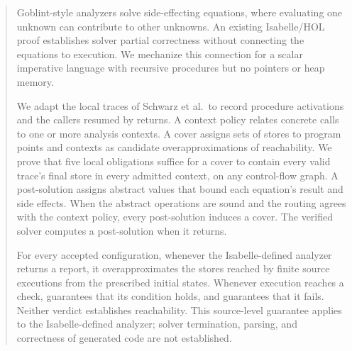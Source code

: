 \begin{abstract}
Goblint-style analyzers solve side-effecting equations, where evaluating one
unknown can contribute to other unknowns. An existing Isabelle/HOL proof
establishes solver partial correctness without connecting the equations to
execution. We mechanize this connection for a scalar imperative language
with recursive procedures but no pointers or heap memory.

We adapt the local traces of Schwarz et al.\ to record procedure activations
and the callers resumed by returns. A context policy relates concrete calls
to one or more analysis contexts. A cover assigns sets of stores to program
points and contexts as candidate overapproximations of reachability.
We prove that five local obligations suffice for a cover to contain every
valid trace's final store in every admitted context, on any control-flow
graph. A post-solution assigns abstract values that bound each equation's
result and side effects. When the abstract operations are sound and the
routing agrees with the context policy, every post-solution induces a
cover. The verified solver computes a post-solution when it returns.

For every accepted configuration, whenever the Isabelle-defined analyzer
returns a report, it overapproximates the stores reached by finite
source executions from the prescribed initial states. Whenever execution
reaches a check,  guarantees that its condition holds,
and  guarantees that it fails. Neither verdict
establishes reachability. This source-level guarantee applies to the Isabelle-defined analyzer; solver termination, parsing, and correctness of generated code
are not established.
\end{abstract}
